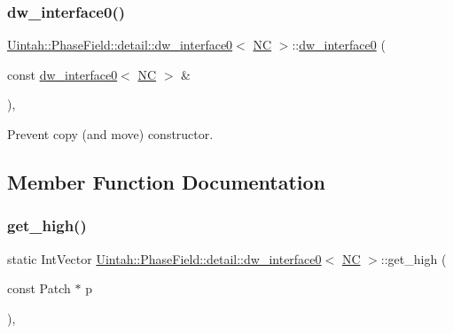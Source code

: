 \subsubsection{\texorpdfstring{dw\+\_\+interface0()}{dw\_interface0()}\hspace{0.1cm}{\footnotesize\ttfamily [2/2]}}
{\footnotesize\ttfamily \hyperlink{classUintah_1_1PhaseField_1_1detail_1_1dw__interface0}{Uintah\+::\+Phase\+Field\+::detail\+::dw\+\_\+interface0}$<$ \hyperlink{namespaceUintah_1_1PhaseField_a33d355affda78a83f45755ba8388cedda77924170fe82bfd58b74ca3e44139718}{NC} $>$\+::\hyperlink{classUintah_1_1PhaseField_1_1detail_1_1dw__interface0}{dw\+\_\+interface0} (\begin{DoxyParamCaption}\item[{const \hyperlink{classUintah_1_1PhaseField_1_1detail_1_1dw__interface0}{dw\+\_\+interface0}$<$ \hyperlink{namespaceUintah_1_1PhaseField_a33d355affda78a83f45755ba8388cedda77924170fe82bfd58b74ca3e44139718}{NC} $>$ \&}]{ }\end{DoxyParamCaption})\hspace{0.3cm}{\ttfamily [protected]}, {\ttfamily [delete]}}



Prevent copy (and move) constructor. 



\subsection{Member Function Documentation}
\mbox{\label{classUintah_1_1PhaseField_1_1detail_1_1dw__interface0_3_01NC_01_4_a5802f2280d1671d47ba20e6b763bc3bd}} 
\subsubsection{\texorpdfstring{get\+\_\+high()}{get\_high()}}
{\footnotesize\ttfamily static Int\+Vector \hyperlink{classUintah_1_1PhaseField_1_1detail_1_1dw__interface0}{Uintah\+::\+Phase\+Field\+::detail\+::dw\+\_\+interface0}$<$ \hyperlink{namespaceUintah_1_1PhaseField_a33d355affda78a83f45755ba8388cedda77924170fe82bfd58b74ca3e44139718}{NC} $>$\+::get\+\_\+high (\begin{DoxyParamCaption}\item[{const Patch $\ast$}]{p }\end{DoxyParamCaption})\hspace{0.3cm}{\ttfamily [inline]}, {\ttfamily [static]}}



